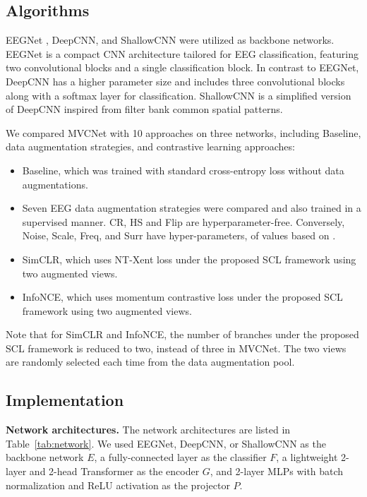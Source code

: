 \documentclass[journal]{IEEEtran}
\begin{document}
\subsection{Algorithms}
EEGNet \cite{Lawhern2018EEGNet}, DeepCNN, and ShallowCNN \cite{deepshallow2017} were utilized as backbone networks. 
EEGNet is a compact CNN architecture tailored for EEG classification, featuring two convolutional blocks and a single classification block. In contrast to EEGNet, DeepCNN has a higher parameter size and includes three convolutional blocks along with a softmax layer for classification. ShallowCNN is a simplified version of DeepCNN inspired from filter bank common spatial patterns. 

We compared MVCNet with 10 approaches on three networks, including Baseline, data augmentation strategies, and contrastive learning approaches:
\begin{itemize}
\item Baseline, which was trained with standard cross-entropy loss without data augmentations.
\item Seven EEG data augmentation strategies were compared and also trained in a supervised manner. CR, HS and Flip are hyperparameter-free. Conversely, Noise, Scale, Freq, and Surr have hyper-parameters, of values based on \cite{Zhang2022MSDT,pei2021hs}.
\item SimCLR, which uses NT-Xent loss \cite{simclr2020} under the proposed SCL framework using two augmented views. 
\item InfoNCE, which uses momentum contrastive loss \cite{he2020moco} under the proposed SCL framework using two augmented views. 
\end{itemize}

Note that for SimCLR and InfoNCE, the number of branches under the proposed SCL framework is reduced to two, instead of three in MVCNet. The two views are randomly selected each time from the data augmentation pool.

\subsection{Implementation}
\textbf{Network architectures.} The network architectures are listed in Table~\ref{tab:network}. We used EEGNet, DeepCNN, or ShallowCNN as the backbone network $E$, a fully-connected layer as the classifier $F$, a lightweight 2-layer and 2-head Transformer \cite{vaswani2017attention} as the encoder $G$, and 2-layer MLPs with batch normalization and ReLU activation as the projector $P$. 
\end{document}
